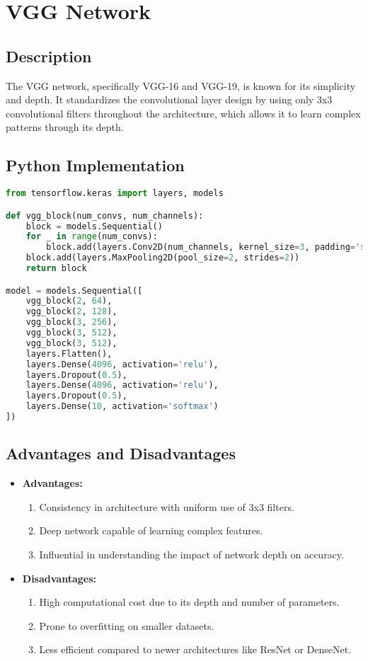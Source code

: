\chapter{VGG Network}

\section{Description}
The VGG network, specifically VGG-16 and VGG-19, is known for its simplicity and depth. It standardizes the convolutional layer design by using only 3x3 convolutional filters throughout the architecture, which allows it to learn complex patterns through its depth.

\section{Python Implementation}
\begin{lstlisting}[language=Python]
from tensorflow.keras import layers, models

def vgg_block(num_convs, num_channels):
    block = models.Sequential()
    for _ in range(num_convs):
        block.add(layers.Conv2D(num_channels, kernel_size=3, padding='same', activation='relu'))
    block.add(layers.MaxPooling2D(pool_size=2, strides=2))
    return block

model = models.Sequential([
    vgg_block(2, 64),
    vgg_block(2, 128),
    vgg_block(3, 256),
    vgg_block(3, 512),
    vgg_block(3, 512),
    layers.Flatten(),
    layers.Dense(4096, activation='relu'),
    layers.Dropout(0.5),
    layers.Dense(4096, activation='relu'),
    layers.Dropout(0.5),
    layers.Dense(10, activation='softmax')
])
\end{lstlisting}

\section{Advantages and Disadvantages}
\begin{itemize}
    \item \textbf{Advantages:}
    \begin{enumerate}
        \item Consistency in architecture with uniform use of 3x3 filters.
        \item Deep network capable of learning complex features.
        \item Influential in understanding the impact of network depth on accuracy.
    \end{enumerate}
    \item \textbf{Disadvantages:}
    \begin{enumerate}
        \item High computational cost due to its depth and number of parameters.
        \item Prone to overfitting on smaller datasets.
        \item Less efficient compared to newer architectures like ResNet or DenseNet.
    \end{enumerate}
\end{itemize}

